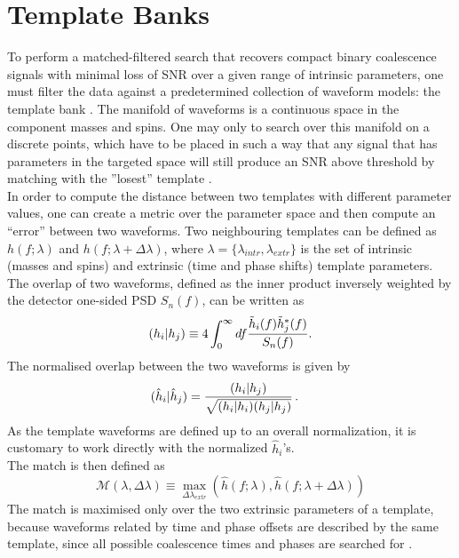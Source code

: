 \documentclass[binding=0.6cm, LaM]{sapthesis}
\begin{document}
\section{Template Banks}
\label{sec:template_banks}
	To perform a matched-filtered search that recovers compact binary coalescence signals
	with minimal loss of SNR over a given range of intrinsic parameters, 
	one must filter the data against a predetermined collection of waveform models: the template bank \cite{28}.
	The manifold of waveforms is a continuous space in the component masses and spins. 
	One may only to search over this manifold on a discrete points, 
	which have to be placed in such a way that any signal
	that has parameters in the targeted space will still produce an SNR 
	above threshold by matching with the ''losest'' template \cite{27}. \\ 
	In order to compute the distance between two templates with different parameter values, 
	one can create a metric over the parameter space and then compute an ``error'' between two waveforms.
	Two neighbouring templates can be defined as $h(f;\lambda)$ and $h(f;\lambda + \Delta \lambda)$,
        where $\lambda = \{\lambda_{intr}, \lambda_{extr}\}$ is the set of
        intrinsic (masses and spins) and extrinsic (time and phase shifts) template parameters.
	The overlap of two waveforms, defined as the inner product inversely weighted by the detector one-sided  PSD $S_n(f)$, 
	can be written as  
		\begin{equation}
			(h_i| h_j)  \equiv 4 \int_{0}^{\infty} df {{\tilde h_i(f) \tilde h^*_j(f)} \over {S_n(f)}}.
                \end{equation}
	The normalised overlap between the two waveforms is given by
		\begin{align}
			(\hat{h}_i|\hat{h}_j)& = {{(h_i|h_j)} \over {\sqrt{(h_i| h_i)(h_j| h_j)}}}\,.
		\end{align}
	As the template waveforms are defined up to an overall normalization, 
	it is customary to work directly with the normalized $\hat{h}_i$'s. \\
	The match is then defined as
		\begin{equation}
			\mathcal{M}(\lambda, \Delta \lambda) \equiv \max_{\Delta \lambda_{extr}} (\hat h(f;\lambda), \hat h(f;\lambda + \Delta \lambda))
		\end{equation}
	The match is maximised only over the two extrinsic parameters of a template, 
	because waveforms related by time and phase offsets
	are described by the same template, 
	since all possible coalescence times and phases are searched for \cite{29}. \\
\end{document}
